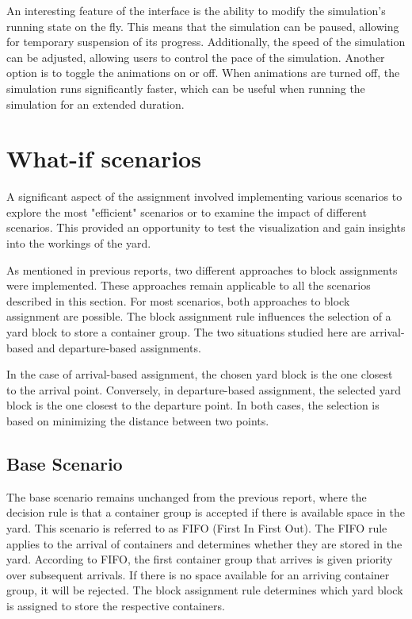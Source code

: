 \documentclass{article}
\begin{document}
An interesting feature of the interface is the ability to modify the
simulation's running state on the fly. This means that the simulation can be
paused, allowing for temporary suspension of its progress. Additionally, the
speed of the simulation can be adjusted, allowing users to control the pace of
the simulation. Another option is to toggle the animations on or off. When
animations are turned off, the simulation runs significantly faster, which can
be useful when running the simulation for an extended duration.

\section{What-if scenarios}
A significant aspect of the assignment involved implementing various scenarios
to explore the most "efficient" scenarios or to examine the impact of different
scenarios. This provided an opportunity to test the visualization and gain
insights into the workings of the yard.

As mentioned in previous reports, two different approaches to block assignments
were implemented. These approaches remain applicable to all the scenarios
described in this section. For most scenarios, both approaches to block
assignment are possible. The block assignment rule influences the selection of
a yard block to store a container group. The two situations studied here are
arrival-based and departure-based assignments.

In the case of arrival-based assignment, the chosen yard block is the one
closest to the arrival point. Conversely, in departure-based assignment, the
selected yard block is the one closest to the departure point. In both cases,
the selection is based on minimizing the distance between two points.

\subsection{Base Scenario}
The base scenario remains unchanged from the previous report, where the
decision rule is that a container group is accepted if there is available space
in the yard. This scenario is referred to as FIFO (First In First Out). The
FIFO rule applies to the arrival of containers and determines whether they are
stored in the yard. According to FIFO, the first container group that arrives
is given priority over subsequent arrivals. If there is no space available for
an arriving container group, it will be rejected. The block assignment rule
determines which yard block is assigned to store the respective containers.
\end{document}
